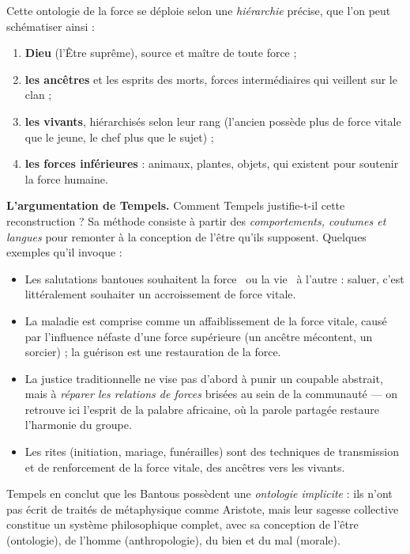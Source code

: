 \documentclass[11pt]{article}
\begin{document}
Cette ontologie de la force se déploie selon une \emph{hiérarchie} précise, que l'on peut schématiser ainsi :

\begin{enumerate}
\item \textbf{Dieu} (l'Être suprême), source et maître de toute force ;
\item \textbf{les ancêtres} et les esprits des morts, forces intermédiaires qui veillent sur le clan ;
\item \textbf{les vivants}, hiérarchisés selon leur rang (l'ancien possède plus de force vitale que le jeune, le chef plus que le sujet) ;
\item \textbf{les forces inférieures} : animaux, plantes, objets, qui existent pour soutenir la force humaine.
\end{enumerate}

\textbf{L'argumentation de Tempels.} Comment Tempels justifie-t-il cette reconstruction ? Sa méthode consiste à partir des \emph{comportements, coutumes et langues} pour remonter à la conception de l'être qu'ils supposent. Quelques exemples qu'il invoque :

\begin{itemize}
\item Les salutations bantoues souhaitent la \guillemotleft force \guillemotright\ ou la \guillemotleft vie \guillemotright\ à l'autre : saluer, c'est littéralement souhaiter un accroissement de force vitale.
\item La maladie est comprise comme un affaiblissement de la force vitale, causé par l'influence néfaste d'une force supérieure (un ancêtre mécontent, un sorcier) ; la guérison est une restauration de la force.
\item La justice traditionnelle ne vise pas d'abord à punir un coupable abstrait, mais à \emph{réparer les relations de forces} brisées au sein de la communauté — on retrouve ici l'esprit de la palabre africaine, où la parole partagée restaure l'harmonie du groupe.
\item Les rites (initiation, mariage, funérailles) sont des techniques de transmission et de renforcement de la force vitale, des ancêtres vers les vivants.
\end{itemize}

Tempels en conclut que les Bantous possèdent une \emph{ontologie implicite} : ils n'ont pas écrit de traités de métaphysique comme Aristote, mais leur sagesse collective constitue un système philosophique complet, avec sa conception de l'être (ontologie), de l'homme (anthropologie), du bien et du mal (morale).
\end{document}
